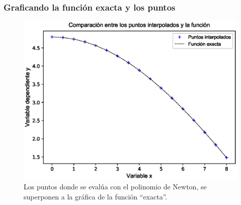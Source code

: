 \begin{frame}
\frametitle{Graficando la función exacta y los puntos}
\begin{figure}
	\centering
	\includegraphics[scale=0.4]{Imagenes/EjemploInterpNewton_01.eps}
    \caption{Los puntos donde se evalúa con el polinomio de Newton, se superponen a la gráfica de la función \enquote{exacta}.}
\end{figure}
\end{frame}
